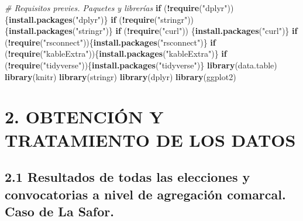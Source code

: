 \documentclass[
]{article}
\newenvironment{Shaded}{\begin{snugshade}}{\end{snugshade}}
\newcommand{\CommentTok}[1]{\textcolor[rgb]{0.56,0.35,0.01}{\textit{#1}}}
\newcommand{\ControlFlowTok}[1]{\textcolor[rgb]{0.13,0.29,0.53}{\textbf{#1}}}
\newcommand{\FunctionTok}[1]{\textcolor[rgb]{0.13,0.29,0.53}{\textbf{#1}}}
\newcommand{\NormalTok}[1]{#1}
\newcommand{\SpecialCharTok}[1]{\textcolor[rgb]{0.81,0.36,0.00}{\textbf{#1}}}
\newcommand{\StringTok}[1]{\textcolor[rgb]{0.31,0.60,0.02}{#1}}
\begin{document}
\begin{Shaded}
\begin{Highlighting}[]
\CommentTok{\# Requisitos previes. Paquetes y librerías}
\ControlFlowTok{if}\NormalTok{ (}\SpecialCharTok{!}\FunctionTok{require}\NormalTok{(}\StringTok{"dplyr"}\NormalTok{)) \{}\FunctionTok{install.packages}\NormalTok{(}\StringTok{"dplyr"}\NormalTok{)\}}
\ControlFlowTok{if}\NormalTok{ (}\SpecialCharTok{!}\FunctionTok{require}\NormalTok{(}\StringTok{"stringr"}\NormalTok{)) \{}\FunctionTok{install.packages}\NormalTok{(}\StringTok{"stringr"}\NormalTok{)\}}
\ControlFlowTok{if}\NormalTok{ (}\SpecialCharTok{!}\FunctionTok{require}\NormalTok{(}\StringTok{"curl"}\NormalTok{)) \{}\FunctionTok{install.packages}\NormalTok{(}\StringTok{"curl"}\NormalTok{)\}}
\ControlFlowTok{if}\NormalTok{ (}\SpecialCharTok{!}\FunctionTok{require}\NormalTok{(}\StringTok{"rsconnect"}\NormalTok{))\{}\FunctionTok{install.packages}\NormalTok{(}\StringTok{"rsconnect"}\NormalTok{)\}}
\ControlFlowTok{if}\NormalTok{ (}\SpecialCharTok{!}\FunctionTok{require}\NormalTok{(}\StringTok{"kableExtra"}\NormalTok{))\{}\FunctionTok{install.packages}\NormalTok{(}\StringTok{"kableExtra"}\NormalTok{)\}}
\ControlFlowTok{if}\NormalTok{ (}\SpecialCharTok{!}\FunctionTok{require}\NormalTok{(}\StringTok{"tidyverse"}\NormalTok{))\{}\FunctionTok{install.packages}\NormalTok{(}\StringTok{"tidyverse"}\NormalTok{)\}}
\FunctionTok{library}\NormalTok{(data.table)}
\FunctionTok{library}\NormalTok{(knitr)}
\FunctionTok{library}\NormalTok{(stringr)}
\FunctionTok{library}\NormalTok{(dplyr)}
\FunctionTok{library}\NormalTok{(ggplot2)}
\end{Highlighting}
\end{Shaded}

\hypertarget{obtenciuxf3n-y-tratamiento-de-los-datos}{%
\section{2. OBTENCIÓN Y TRATAMIENTO DE LOS
DATOS}\label{obtenciuxf3n-y-tratamiento-de-los-datos}}

\hypertarget{resultados-de-todas-las-elecciones-y-convocatorias-a-nivel-de-agregaciuxf3n-comarcal.-caso-de-la-safor.}{%
\subsection{2.1 Resultados de todas las elecciones y convocatorias a
nivel de agregación comarcal. Caso de La
Safor.}\label{resultados-de-todas-las-elecciones-y-convocatorias-a-nivel-de-agregaciuxf3n-comarcal.-caso-de-la-safor.}}
\end{document}
